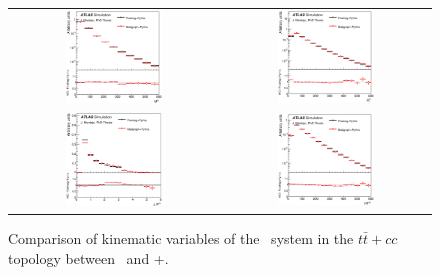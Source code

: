\begin{figure}[p]
\begin{center}
\begin{tabular}{cc}
\includegraphics[width=0.48\textwidth]{Modeling/Figures/defaultcc_tt2cq_qq_m_norm.eps} &
\includegraphics[width=0.48\textwidth]{Modeling/Figures/defaultcc_tt2cq_qq_pt_norm.eps} \\
\includegraphics[width=0.48\textwidth]{Modeling/Figures/defaultcc_tt2cq_qq_dr_norm.eps} &
\includegraphics[width=0.48\textwidth]{Modeling/Figures/defaultcc_tt2cq_qq_ht_norm.eps} \\
\end{tabular}
\caption{Comparison of kinematic variables of the \ccbar\ system in the $t\bar{t}+cc$ topology between \PP\ and \madgraph+\pythia.}
\label{fig:defaultcc_tt2c_cc}
\end{center}
\end{figure}
